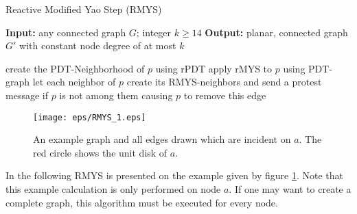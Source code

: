 \begin{algorithm}\small
\caption{Reactive Modified Yao Step (RMYS)}\label{RMYS}
\begin{algorithmic}[0]
\Statex \textbf{Input:} any connected graph $G $; integer $k\geq 14 $
\Statex \textbf{Output:} planar, connected graph $G' $ with constant node degree of at most $k $

\Statex

	\State create the PDT-Neighborhood of $p $ using rPDT
	\State apply rMYS to $p $ using PDT-graph
	\State let each neighbor of $p $ create its RMYS-neighbors and send a protest message if $p $ \indent is not among them causing $p $ to remove this edge
\EndFor 
\end{algorithmic}
\end{algorithm}

\begin{figure}[h!]
\centering
\texttt{[image: eps/RMYS\_1.eps]}
\caption{An example graph and all edges drawn which are incident on $a $. The red circle shows the unit disk of $a $.}
\label{fig:RMYS_1}
\end{figure}

In the following RMYS is presented on the example given by figure \ref{fig:RMYS_1}.
Note that this example calculation is only performed on node $a $.
If one may want to create a complete graph, this algorithm must be executed for every node.

